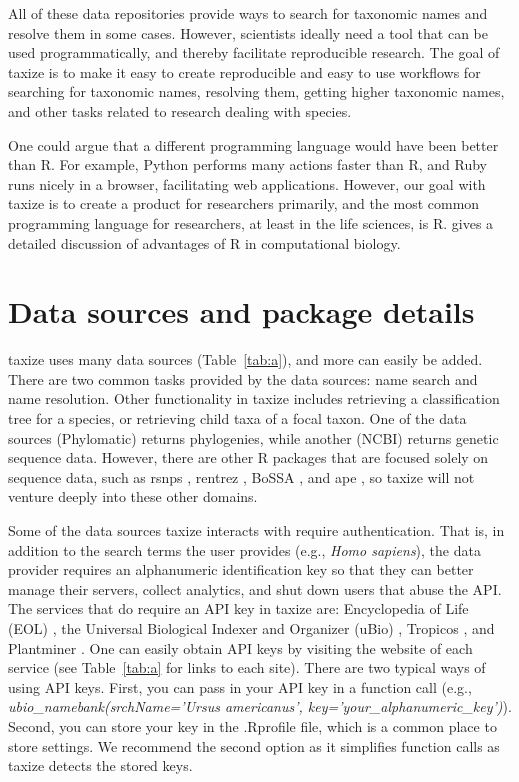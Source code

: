 \documentclass[10pt]{article}\usepackage[]{graphicx}\usepackage[]{color}
\begin{document}
All of these data repositories provide ways to search for taxonomic names and resolve them in some cases. However, scientists ideally need a tool that can be used programmatically, and thereby facilitate reproducible research. The goal of taxize is to make it easy to create reproducible and easy to use workflows for searching for taxonomic names, resolving them, getting higher taxonomic names, and other tasks related to research dealing with species. 

One could argue that a different programming language would have been better than R. For example, Python performs many actions faster than R, and Ruby runs nicely in a browser, facilitating web applications. However, our goal with taxize is to create a product for researchers primarily, and the most common programming language for researchers, at least in the life sciences, is R. \cite{gentleman_bioconductor:_2004} gives a detailed discussion of advantages of R in computational biology.

\section*{Data sources and package details}
taxize uses many data sources (Table~\ref{tab:a}), and more can easily be added. There are two common tasks provided by the data sources: name search and name resolution. Other functionality in taxize includes retrieving a classification tree for a species, or retrieving child taxa of a focal taxon. One of the data sources (Phylomatic) returns phylogenies, while another (NCBI) returns genetic sequence data. However, there are other R packages that are focused solely on sequence data, such as rsnps \cite{chamberlain2013}, rentrez \cite{winter2013}, BoSSA \cite{lefeuvre2010}, and ape \cite{paradis2004}, so taxize will not venture deeply into these other domains. 

Some of the data sources taxize interacts with require authentication. That is, in addition to the search terms the user provides (e.g., \emph{Homo sapiens}), the data provider requires an alphanumeric identification key so that they can better manage their servers, collect analytics, and shut down users that abuse the API. The services that do require an API key in taxize are: Encyclopedia of Life (EOL) \cite{eol}, the Universal Biological Indexer and Organizer (uBio) \cite{ubio}, Tropicos \cite{tropicos}, and Plantminer \cite{carvalho2010plantminer}. One can easily obtain API keys by visiting the website of each service (see Table~\ref{tab:a} for links to each site). There are two typical ways of using API keys. First, you can pass in your API key in a function call (e.g., \emph{ubio\_namebank(srchName='Ursus americanus', key='your\_alphanumeric\_key')}). Second, you can store your key in the .Rprofile file, which is a common place to store settings. We recommend the second option as it simplifies function calls as taxize detects the stored keys.
\end{document}
